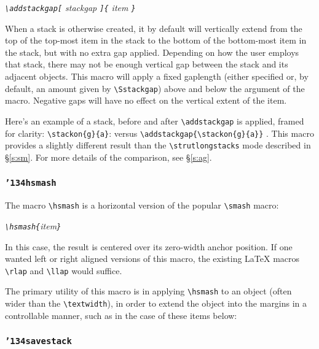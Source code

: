 \documentclass{article}
\let\vb\verb
\newcommand\cmd[1]{\texttt{\char'134#1}}
\begin{document}
\itshape
  \vb|\addstackgap[|%
  stackgap%
  \vb|]{|%
  item%
  \vb|}|
\upshape

When a stack is otherwise created, it by default will vertically extend
from the top of the top-most item in the stack to the bottom of the
bottom-most item in the stack, but with no extra gap applied.  Depending
on how the user employs that stack, there may not be enough vertical gap
between the stack and its adjacent objects.  This macro will apply a
fixed gaplength (either specified or, by default, an amount given by
\vb|\Sstackgap|) above and below the argument of the macro.  Negative
gaps will have no effect on the vertical extent of the item.

Here's an example of a stack, before and after \vb|\addstackgap| is
applied, framed for clarity:
\vb|\stackon{g}{a}|:  versus
\vb|\addstackgap{\stackon{g}{a}}| .
This macro provides a slightly different result than the
\vb|\strutlongstacks| mode described in \S\ref{s:sm}.  For more details
of the comparison, see \S\ref{s:ag}.

\subsubsection{\cmd{hsmash}\label{s:hsm}}
\def\stacktype{L}

The macro \vb|\hsmash| is a horizontal version of the popular
\vb|\smash| macro:

\itshape
  \vb|\hsmash{|item\vb|}|
\upshape

In this case, the result is centered over its zero-width anchor
position.  If one wanted left or right aligned versions of this macro,
the existing \LaTeX{} macros \vb|\rlap| and \vb|\llap| would suffice.

The primary utility of this macro is in applying \vb|\hsmash| to an
object (often wider than the \vb|\textwidth|), in order to extend the
object into the margins in a controllable manner, such as in the case of
these items below:

{\centering{}\par}

\hsmash{\rule{5ex}{1ex}}\hfill\hsmash{\rule{2ex}{0ex}\rule{5em}{1ex}}

\subsubsection{\cmd{savestack}\label{s:ss}}
\end{document}
